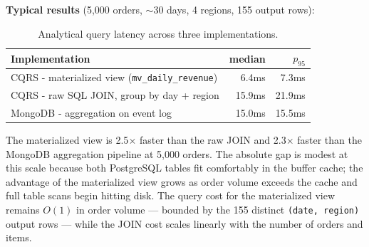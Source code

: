 \documentclass[11pt,a4paper]{article}
\newcommand{\code}[1]{\texttt{\small #1}}
\begin{document}
\textbf{Typical results} (5,000 orders, $\sim$30 days, 4 regions, 155 output rows):

\begin{table}[H]
\centering
\caption{Analytical query latency across three implementations.}
\begin{tabular}{lrr}
\toprule
\textbf{Implementation} & \textbf{median} & $p_{95}$ \\
\midrule
CQRS - materialized view (\code{mv\_daily\_revenue}) & 6.4ms  & 7.3ms  \\
CQRS - raw SQL JOIN, group by day + region           & 15.9ms & 21.9ms \\
MongoDB - aggregation on event log                   & 15.0ms & 15.5ms \\
\bottomrule
\end{tabular}
\end{table}

The materialized view is 2.5$\times$ faster than the raw JOIN and 2.3$\times$ faster than the MongoDB aggregation pipeline at 5,000 orders. The absolute gap is modest at this scale because both PostgreSQL tables fit comfortably in the buffer cache; the advantage of the materialized view grows as order volume exceeds the cache and full table scans begin hitting disk. The query cost for the materialized view remains $O(1)$ in order volume — bounded by the 155 distinct \code{(date, region)} output rows — while the JOIN cost scales linearly with the number of orders and items.


\end{document}
